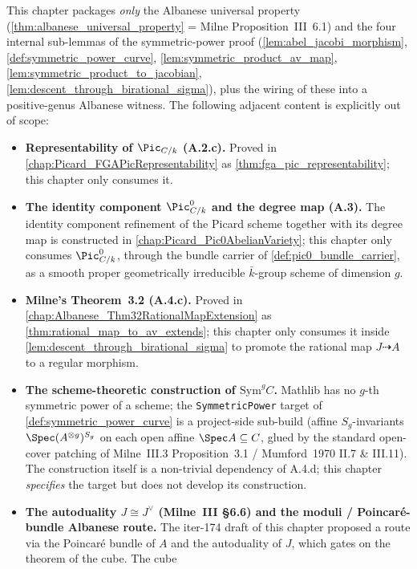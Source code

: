 This chapter packages \emph{only} the Albanese universal property
(\cref{thm:albanese_universal_property} = Milne Proposition~III~6.1) and the
four internal sub-lemmas of the symmetric-power proof
(\cref{lem:abel_jacobi_morphism},
\cref{def:symmetric_power_curve},
\cref{lem:symmetric_product_av_map},
\cref{lem:symmetric_product_to_jacobian},
\cref{lem:descent_through_birational_sigma}), plus the wiring of these into
a positive-genus Albanese witness. The following adjacent content is
explicitly out of scope:
\begin{itemize}
  \item \textbf{Representability of \(\Pic_{C/k}\) (A.2.c).} Proved in
    \cref{chap:Picard_FGAPicRepresentability} as
    \cref{thm:fga_pic_representability}; this chapter only consumes it.
  \item \textbf{The identity component \(\Pic^0_{C/k}\) and the degree map
    (A.3).} The identity component refinement of the Picard scheme together
    with its degree map is constructed in
    \cref{chap:Picard_Pic0AbelianVariety}; this chapter only consumes
    \(\Pic^0_{C/k}\), through the bundle carrier of
    \cref{def:pic0_bundle_carrier}, as a smooth proper geometrically
    irreducible \(\bar k\)-group scheme of dimension \(g\).
  \item \textbf{Milne's Theorem~3.2 (A.4.c).} Proved in
    \cref{chap:Albanese_Thm32RationalMapExtension} as
    \cref{thm:rational_map_to_av_extends}; this chapter only consumes it
    inside \cref{lem:descent_through_birational_sigma} to promote the
    rational map \(J \dashrightarrow A\) to a regular morphism.
  \item \textbf{The scheme-theoretic construction of \(\mathrm{Sym}^g C\).}
    Mathlib has no \(g\)-th symmetric power of a scheme; the
    \texttt{SymmetricPower} target of \cref{def:symmetric_power_curve} is a
    project-side sub-build (affine \(S_g\)-invariants
    \(\Spec(A^{\otimes g})^{S_g}\) on each open affine \(\Spec A \subseteq C\),
    glued by the standard open-cover patching of Milne~III.3
    Proposition~3.1 / Mumford~1970 II.7 \& III.11). The construction itself
    is a non-trivial dependency of A.4.d; this chapter \emph{specifies} the
    target but does not develop its construction.
  \item \textbf{The autoduality \(J \cong J^\vee\) (Milne~III \S 6.6) and the
    moduli / Poincar\'e-bundle Albanese route.} The iter-174 draft of this
    chapter proposed a route via the Poincar\'e bundle of \(A\) and the
    autoduality of \(J\), which gates on the theorem of the cube. The cube

\end{itemize}
